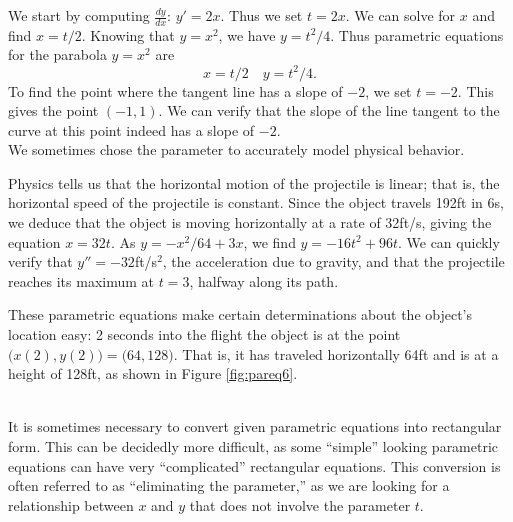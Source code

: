 {We start by computing $\frac{dy}{dx}$: $y' = 2x$. Thus we set $t=2x$. We can solve for $x$ and find $x= t/2$. Knowing that $y=x^2$, we have $y= t^2/4$. Thus parametric equations for the parabola $y=x^2$ are $$x=t/2 \quad y=t^2/4.$$
To find the point where the tangent line has a slope of $-2$, we set $t=-2$. This gives the point $(-1, 1)$. We can verify that the slope of the line tangent to the curve at this point indeed has a slope of $-2$.
}\\

We sometimes chose the parameter to accurately model physical behavior.\\

{Physics tells us that the horizontal motion of the projectile is linear; that is, the horizontal speed of the projectile is constant. Since the object travels 192ft in 6s, we deduce that the object is moving horizontally at a rate of 32ft/s, giving the equation $x=32t$. As $y=-x^2/64+3x$, we find $y= -16t^2+96t$. We can quickly verify that $y''=-32$ft/s$^2$, the acceleration due to gravity, and that the projectile reaches its maximum at $t=3$, halfway along its path.

These parametric equations make certain determinations about the object's location easy: 2 seconds into the flight the object is at the point $\big(x(2),y(2)\big) = \big(64,128\big)$. That is, it has traveled horizontally 64ft and is at a height of 128ft, as shown in Figure \ref{fig:pareq6}.
}\\

It is  sometimes necessary to convert given parametric equations into rectangular form. This can be decidedly more difficult, as some ``simple'' looking parametric equations can have very ``complicated'' rectangular equations. This conversion is often referred to as ``eliminating the parameter,'' as we are looking for a relationship between $x$ and $y$ that does not involve the parameter $t$.\\

